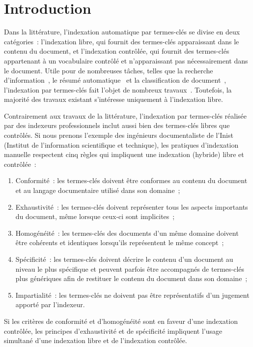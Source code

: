 \section{Introduction}
\label{sec:main:domain_specific_keyphrase_annotation-introduction}
  Dans la littérature, l'indexation automatique par termes-clés se divise en
  deux catégories~: l'indexation libre, qui fournit des termes-clés apparaissant
  dans le contenu du document, et l'indexation contrôlée, qui fournit des
  termes-clés appartenant à un vocabulaire contrôlé et n'apparaissant pas
  nécessairement dans le document. Utile pour de nombreuses tâches, telles que
  la recherche d'information~\cite{jones1999phrasier}, le résumé
  automatique~\cite{avanzo2005keyphrase} et la classification de
  document~\cite{han2007webdocumentclustering}, l'indexation par termes-clés
  fait l'objet de nombreux travaux~\cite{hasan2014state_of_the_art}. Toutefois,
  la majorité des travaux existant s'intéresse uniquement à l'indexation libre.
  
  Contrairement aux travaux de la littérature, l'indexation par termes-clés
  réalisée par des indexeurs professionnels inclut aussi bien des termes-clés
  libres que contrôlés. Si nous prenons l'exemple des ingénieurs documentaliste
  de l'Inist (Institut de l'information scientifique et technique), les
  pratiques d'indexation manuelle respectent cinq règles qui impliquent une
  indexation (hybride) libre et contrôlée~:
  \begin{enumerate}
    \item{Conformité~: les termes-clés doivent être conformes au contenu du
          document et au langage documentaire utilisé dans son domaine~;}
    \item{Exhaustivité~: les termes-clés doivent représenter tous les
          aspects importants du document, même lorsque ceux-ci sont
          implicites~;}
    \item{Homogénéité~: les termes-clés des documents d'un même domaine
          doivent être cohérents et identiques lorsqu'ils représentent le
          même concept~;}
    \item{Spécificité~: les termes-clés doivent décrire le contenu d'un
          document au niveau le plus spécifique et peuvent parfois être
          accompagnés de termes-clés plus génériques afin de restituer le
          contenu du document dans son domaine~;}
    \item{Impartialité~: les termes-clés ne doivent pas être représentatifs
          d'un jugement apporté par l'indexeur.}
  \end{enumerate}
  Si les critères de conformité et d'homogénéité sont en faveur d'une indexation
  contrôlée, les principes d'exhaustivité et de spécificité impliquent l'usage
  simultané d'une indexation libre et de l'indexation contrôlée.

